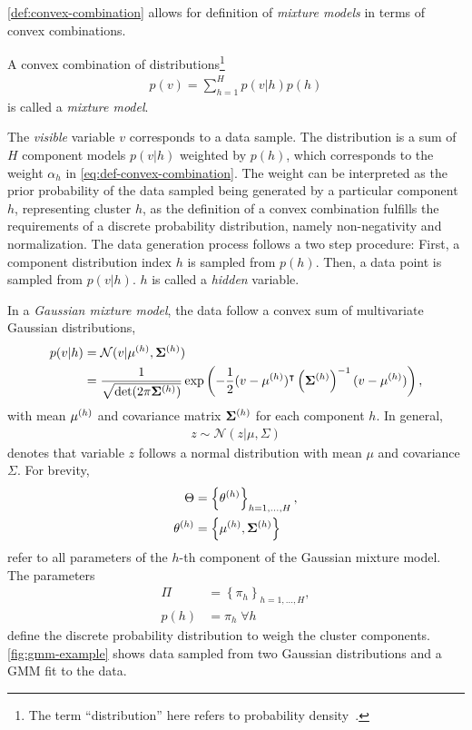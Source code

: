 \cref{def:convex-combination} allows for definition of \emph{mixture models} in terms of convex
combinations.
\begin{mydef}
    \label{def:mixture-model}
    A convex combination of distributions\footnote{The term ``distribution'' here refers to probability density~\citep[158]{barber_12_bayesian}.}
    \begin{align}
        \label{eq:gmm-distribution}
        p(v) = \sum_{h=1}^Hp(v|h)p(h)
    \end{align}
    is called a \emph{mixture model}.
\end{mydef}
The \emph{visible} variable $v$ corresponds to a data sample. The distribution is a sum of $H$
component models $p(v|h)$ weighted by $p(h)$, which corresponds to the weight $\alpha_h$ in
\cref{eq:def-convex-combination}. The weight can be interpreted as the prior probability of the data
sampled being generated by a particular component $h$, representing cluster $h$, as the definition
of a convex combination fulfills the requirements of a discrete probability distribution, namely
non-negativity and normalization. The data generation process follows a two step procedure: First, a
component distribution index $h$ is sampled from $p(h)$. Then, a data point is sampled from
$p(v|h)$. $h$ is called a \emph{hidden} variable.

In a \emph{Gaussian mixture model}, the data follow a convex sum of multivariate Gaussian distributions,
\begin{align}
    \label{eq:gmm-normal}
    p(v|h) &= \mathcal{N}({v}|\mathbf{\mu }^{(h)} , \mathbf{\Sigma }^{(h)} ) \\ 
    &= \frac{1}{\sqrt{\det(2\pi\mathbf{\Sigma }^{(h)} )} }\exp\left(-\frac{1}{2}({v}-\mathbf{\mu }^{(h)} )^\intercal
        \left(\mathbf{\Sigma }^{(h)}\right) ^{-1} ({v}-\mathbf{\mu }^{(h)} )\right),
\end{align}
with mean $\mathbf{\mu }^{(h)}$ and covariance matrix $\mathbf{\Sigma }^{(h)}$ for each component $h$. In general,
\begin{align}
    z\sim\mathcal{N}(z|\mu, \Sigma)
\end{align}
denotes that variable $z$ follows a normal distribution with
mean $\mu$ and covariance $\Sigma$. For brevity,
\begin{align}
    \label{eq:gmm-theta}
    \Theta &= \left\{\mathbf{\theta}^{(h)}\right\}_{h=1,\hdots ,H}, \\
    \mathbf{\theta}^{(h)} &= \left\{\mathbf{\mu }^{(h)}, \mathbf{\Sigma }^{(h)}\right\}
\end{align}
refer to all parameters of the $h$-th component of the Gaussian mixture model. The parameters
\begin{align}
    \label{eq:gmm-pi}
    \Pi &= \left\{\pi_h\right\}_{h = 1, \hdots , H}, \\
    p(h) &= \pi_h \; \forall h \label{eq:gmm-pi-2}
\end{align}
define the discrete probability distribution to weigh the cluster components. \cref{fig:gmm-example}
shows data sampled from two Gaussian distributions and a GMM fit to the data.

